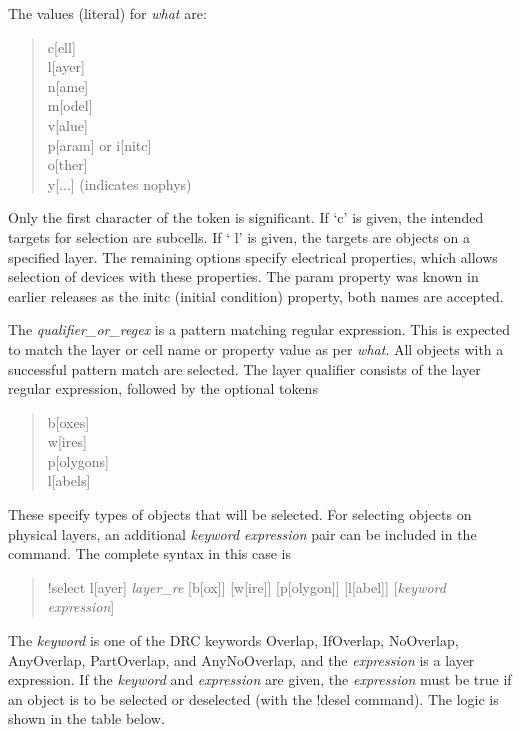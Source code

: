 The values (literal) for {\it what} are:
\begin{quote}\rr
{\vt c}[ell]\\
{\vt l}[ayer]\\
{\vt n}[ame]\\
{\vt m}[odel]\\
{\vt v}[alue]\\
{\vt p}[aram] or {\vt i}[nitc]\\
{\vt o}[ther]\\
{\vt y}[...] (indicates {\et nophys})
\end{quote}
Only the first character of the token is significant.  If `{\vt c}'
is given, the intended targets for selection are subcells.  If `{\vt
l}' is given, the targets are objects on a specified layer.  The
remaining options specify electrical properties, which allows
selection of devices with these properties.  The {\vt param} property
was known in earlier releases as the {\vt initc} (initial condition)
property, both names are accepted.

The {\it qualifier\_or\_regex\/} is a pattern matching regular
expression.  This is expected to match the layer or cell name or
property value as per {\it what}.  All objects with a successful
pattern match are selected.  The layer qualifier consists of the layer
regular expression, followed by the optional tokens
\begin{quote}\rr
{\vt b}[oxes]\\
{\vt w}[ires]\\
{\vt p}[olygons]\\
{\vt l}[abels]\\
\end{quote}
These specify types of objects that will be selected.  For selecting
objects on physical layers, an additional {\it keyword expression}
pair can be included in the command.  The complete syntax in this case
is
\begin{quote}
    {\vt !select l[ayer] {\it layer\_re} [b[ox]] [w[ire]] [p[olygon]]
      [l[abel]] [{\it keyword expression\/}]}
\end{quote}
    
The {\it keyword} is one of the DRC keywords {\et Overlap}, {\et
IfOverlap}, {\et NoOverlap}, {\et AnyOverlap}, {\et PartOverlap}, and
{\et AnyNoOverlap}, and the {\it expression} is a layer expression. 
If the {\it keyword} and {\it expression} are given, the {\it
expression} must be true if an object is to be selected or deselected
(with the {\cb !desel} command).  The logic is shown in the table
below.

